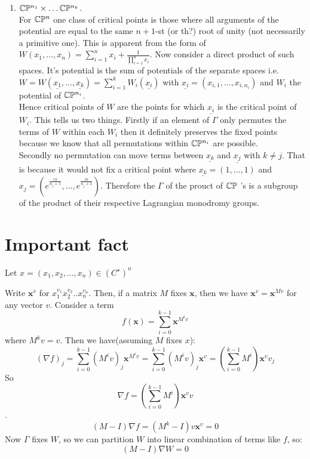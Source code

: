 \documentclass[a4paper]{article}
\begin{document}
\begin{enumerate}
   \item $\mathbb{C}\mathbb{P}^{n_1}\times \ldots \mathbb{C}\mathbb{P}^{n_{k}}$.\\
       For $\mathbb{C}\mathbb{P}^{n}$ one class of critical points is those where all arguments of the potential are equal to the same $n+1$-st (or th?) root of unity (not necessarily a primitive one). This is apparent from the form of $W(x_1, \ldots, x_n)=\sum_{i=1}^{n}x_{i}+\frac{1}{\prod_{i=1}^{n}x_{i}}$. Now consider a direct product of such spaces. It's potential is the sum of potentials of the separate spaces i.e. $W=W\left( \underline{x_1}, \ldots, \underline{x_{k}} \right) =\sum_{i=1}^{k} W_i(\underline{x_{i}})$ with $\underline{x_i}=\left( x_{i,1}, \ldots , x_{i,n_{i}} \right) $ and $W_i$ the potential of $\mathbb{C}\mathbb{P}^{n_{i}}$.\\
       Hence critical points of $W$ are the points for which $\underline{x_{i}}$ is the critical point of $W_{i}$. This tells us two things. Firstly if an element of $\Gamma$ only permutes the terms of $W$ within each $W_i$ then it definitely preserves the fixed points because we know that all permutations within  $\mathbb{C}\mathbb{P}^{n_i}$ are possible.\\
       Secondly no permutation can move terms between $\underline{x_{k}}$ and $ \underline{x_{j}}$ with $k\neq j$. That is because it would not fix a critical point where $\underline{x_k}=\left( 1, \ldots, 1 \right) $ and $x_{j}=\left( e^{\frac{i\pi}{n_j+1}}, \ldots, e^{\frac{i\pi}{n_j+1}}  \right) $. Therefore the $\Gamma$ of the prouct of $\mathbb{C}\mathbb{P}$ 's is a subgroup of the product of their respective Lagrangian monodromy groups.
\end{enumerate} 
	\section{Important fact}
	Let $x = (x_1, x_2, ..., x_n) \in (C^{\star})^n$
	
	Write $\textbf{x}^v$ for $x_1^{v_1} x_2^{v_2} .. x_n^{v_n}$. Then, if a matrix $M$ fixes $\textbf{x}$, then we have $\textbf{x}^v = \textbf{x}^{Mv}$ for any vector $v$.
	Consider a term 
	$$f(\textbf{x}) = \sum_{i=0}^{k-1} \textbf{x}^{M^i v}$$
	where $M^k v =v$.
	Then we have(assuming $M$ fixes $x$):
	$$(\nabla f)_j = \sum_{i=0}^{k-1} (M^i v)_j \textbf{x}^{M^i v} = \sum_{i=0}^{k-1} (M^i v)_j \textbf{x}^{v} = (\sum_{i=0}^{k-1} M^i) \textbf{x}^{v} v_j$$
	So $$\nabla f = (\sum_{i=0}^{k-1} M^i) \textbf{x}^{v} v$$.
	$$(M-I)\nabla f= (M^k-I)v \textbf{x}^{v}= 0$$
	Now $\Gamma$ fixes $W$, so we can partition $W$ into linear combination of terms like $f$, so:
	$$(M-I)\nabla W = 0$$
\end{document}

